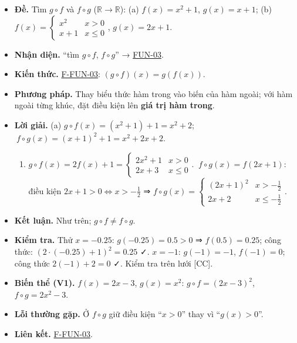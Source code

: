 \documentclass[
  10pt,
  twoside,openany]{book}
\providecommand{\tightlist}{%
  \setlength{\itemsep}{0pt}\setlength{\parskip}{0pt}}
\begin{document}
\begin{itemize}
\tightlist
\item
  \textbf{Đề.} Tìm \(g\circ f\) và \(f\circ g\)
  (\(\mathbb R\to\mathbb R\)): (a) \(f(x)=x^2+1\), \(g(x)=x+1\); (b)
  \(f(x)=\begin{cases}x^2&x>0\\x+1&x\le0\end{cases}\), \(g(x)=2x+1\).
\item
  \textbf{Nhận diện.} ``tìm \(g\circ f\), \(f\circ g\)'' →
  \protect\hyperlink{FUN-03}{FUN-03}.
\item
  \textbf{Kiến thức.} \protect\hyperlink{F-FUN-03}{F-FUN-03}:
  \((g\circ f)(x)=g(f(x))\).
\item
  \textbf{Phương pháp.} Thay biểu thức hàm trong vào biến của hàm ngoài;
  với hàm ngoài từng khúc, đặt điều kiện lên \textbf{giá trị hàm trong}.
\item
  \textbf{Lời giải.} (a) \(g\circ f(x)=(x^2+1)+1=x^2+2\);
  \(\ f\circ g(x)=(x+1)^2+1=x^2+2x+2\).

  \begin{enumerate}
  \def\labelenumi{(\alph{enumi})}
  \setcounter{enumi}{1}
  \tightlist
  \item
    \(g\circ f(x)=2f(x)+1=\begin{cases}2x^2+1&x>0\\2x+3&x\le0\end{cases}\).
    \(\ f\circ g(x)=f(2x+1)\): điều kiện
    \(2x+1>0\Leftrightarrow x>-\tfrac12\) ⇒
    \(f\circ g(x)=\begin{cases}(2x+1)^2&x>-\tfrac12\\2x+2&x\le-\tfrac12\end{cases}\).
  \end{enumerate}
\item
  \textbf{Kết luận.} Như trên; \(g\circ f\ne f\circ g\).
\item
  \textbf{Kiểm tra.} Thử \(x=-0.25\): \(g(-0.25)=0.5>0\) ⇒
  \(f(0.5)=0.25\); công thức: \((2\cdot(-0.25)+1)^2=0.25\) ✓. \(x=-1\):
  \(g(-1)=-1\), \(f(-1)=0\); công thức \(2(-1)+2=0\) ✓. Kiểm tra trên
  lưới {[}CC{]}.
\item
  \textbf{Biến thể (V1).} \(f(x)=2x-3\), \(g(x)=x^2\):
  \(g\circ f=(2x-3)^2\), \(f\circ g=2x^2-3\).
\item
  \textbf{Lỗi thường gặp.} Ở \(f\circ g\) giữ điều kiện ``\(x>0\)'' thay
  vì ``\(g(x)>0\)''.
\item
  \textbf{Liên kết.} \protect\hyperlink{F-FUN-03}{F-FUN-03}.
\end{itemize}
\end{document}
